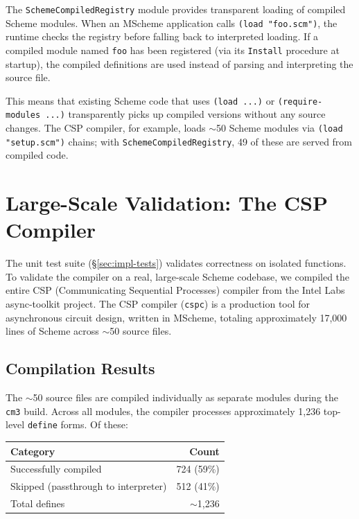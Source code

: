 \documentclass[12pt]{report}
\begin{document}
The \texttt{SchemeCompiledRegistry} module provides transparent
loading of compiled Scheme modules.  When an MScheme application
calls \texttt{(load "foo.scm")}, the runtime checks the registry
before falling back to interpreted loading.  If a compiled module
named \texttt{foo} has been registered (via its \texttt{Install}
procedure at startup), the compiled definitions are used instead
of parsing and interpreting the source file.

This means that existing Scheme code that uses \texttt{(load ...)}
or \texttt{(require-modules ...)} transparently picks up compiled
versions without any source changes.  The CSP compiler, for example,
loads $\sim$50 Scheme modules via \texttt{(load "setup.scm")} chains;
with \texttt{SchemeCompiledRegistry}, 49 of these are served from
compiled code.

\section{Large-Scale Validation: The CSP Compiler}
\label{sec:impl-cspc}

The unit test suite (\S\ref{sec:impl-tests}) validates correctness on
isolated functions.  To validate the compiler on a real, large-scale
Scheme codebase, we compiled the entire CSP (Communicating Sequential
Processes) compiler from the Intel Labs async-toolkit project.  The
CSP compiler (\texttt{cspc}) is a production tool for asynchronous
circuit design, written in MScheme, totaling approximately 17,000
lines of Scheme across $\sim$50 source files.

\subsection{Compilation Results}

The $\sim$50 source files are compiled individually as separate
modules during the \texttt{cm3} build.  Across all modules, the
compiler processes approximately 1,236 top-level \texttt{define}
forms.  Of these:

\begin{center}
\begin{tabular}{lr}
\toprule
\textbf{Category} & \textbf{Count} \\
\midrule
Successfully compiled    & 724 (59\%) \\
Skipped (passthrough to interpreter) & 512 (41\%) \\
\midrule
Total defines     & $\sim$1,236 \\
\bottomrule
\end{tabular}
\end{center}
\end{document}
